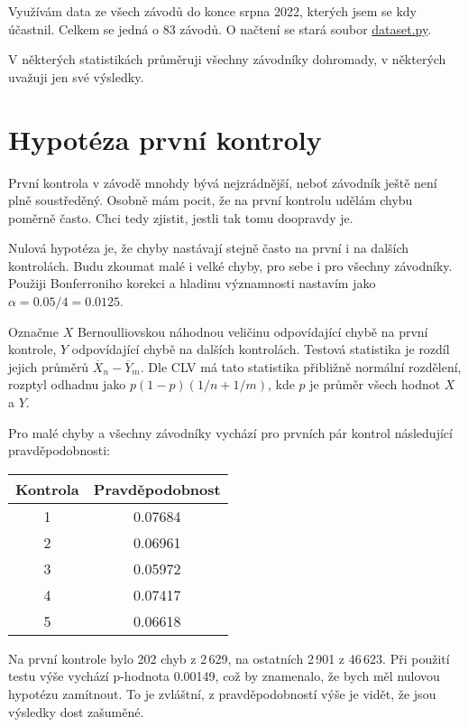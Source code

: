 \documentclass[a4paper,11pt]{article}
\begin{document}
Využívám data ze všech závodů do konce srpna 2022, kterých jsem se kdy účastnil.
Celkem se jedná o 83 závodů. O načtení se stará soubor \href{TODO}{dataset.py}.

V některých statistikách průměruji všechny závodníky dohromady, v některých
uvažuji jen své výsledky.
\pagebreak

\section*{Hypotéza první kontroly}

První kontrola v závodě mnohdy bývá nejzrádnější, neboť závodník ještě není plně
soustředěný. Osobně mám pocit, že na první kontrolu udělám chybu poměrně často.
Chci tedy zjistit, jestli tak tomu doopravdy je.

Nulová hypotéza je, že chyby nastávají stejně často na první i na dalších
kontrolách. Budu zkoumat malé i velké chyby, pro sebe i pro všechny závodníky.
Použiji Bonferroniho korekci a hladinu významnosti nastavím jako
$\alpha = 0.05 / 4 = 0.0125$.

Označme $X$ Bernoulliovskou náhodnou veličinu odpovídající chybě na první
kontrole, $Y$ odpovídající chybě na dalších kontrolách. Testová statistika je
rozdíl jejich průměrů $\overline{X}_n - \overline{Y}_m$. Dle CLV má tato
statistika přibližně normální rozdělení, rozptyl odhadnu jako
$p (1-p) (1/n + 1/m)$, kde $p$ je průměr všech hodnot $X$ a $Y$.

Pro malé chyby a všechny závodníky vychází pro prvních pár kontrol následující
pravděpodobnosti:

\begin{tabular}{c | c}
    Kontrola & Pravděpodobnost \\
    \hline
    1        & 0.07684         \\
    2        & 0.06961         \\
    3        & 0.05972         \\
    4        & 0.07417         \\
    5        & 0.06618         \\
\end{tabular}

Na první kontrole bylo 202 chyb z 2\,629, na ostatních 2\,901 z 46\,623. Při
použití testu výše vychází p-hodnota 0.00149, což by znamenalo, že bych měl
nulovou hypotézu zamítnout. To je zvláštní, z pravděpodobností výše je vidět, že
jsou výsledky dost zašuměné.
\end{document}
